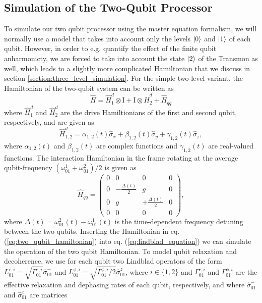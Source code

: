 \subsection{Simulation of the Two-Qubit Processor}

To simulate our two qubit processor using the master equation formalism, we will normally use a model that takes into account only the levels $\left| 0 \right>$ and $\left| 1 \right>$ of each qubit. However, in order to e.g. quantify the effect of the finite qubit anharmonicty, we are forced to take into account the state $\left| 2 \right>$ of the Transmon as well, which leads to a slightly more complicated Hamiltonian that we discuss in section \ref{section:three_level_simulation}. For the simple two-level variant, the Hamiltonian of the two-qubit system can be written as
%
\begin{equation}
\hat{H} = \hat{H}_1^d\otimes\mathrm{I}+\mathrm{I}\otimes\hat{H}_2^d+\hat{H}_{qq} \label{eq:two_qubit_hamiltonian}
\end{equation}
%
where $\hat{H}_1^d$ and $\hat{H}_2^d$ are the drive Hamiltionians of the first and second qubit, respectively, and are given as
%
\begin{equation}
\hat{H}_{1,2}^d = \alpha_{1,2}(t)\hat{\sigma}_x+\beta_{1,2}(t)\hat{\sigma}_y+\gamma_{1,2}(t)\hat{\sigma}_z,
\end{equation}
%
where $\alpha_{1,2}(t)$ and $\beta_{1,2}(t)$ are complex functions and $\gamma_{1,2}(t)$ are real-valued functions. The interaction Hamiltonian in the frame rotating at the average qubit-frequency $(\omega_{01}^1+\omega_{01}^2)/2$ is given as
%
\begin{equation}
\hat{H}_{qq} = \left(\begin{array}{cccc}0 & 0 & 0 & 0 \\ 0 & -\frac{\Delta(t)}{2} & g & 0 \\ 0 & g & +\frac{\Delta(t)}{2} & 0 \\ 0 & 0 & 0 & 0 \end{array}\right),
\end{equation}
%
where $\Delta(t)=\omega_{01}^2(t)-\omega_{01}^1(t)$ is the time-dependent frequency detuning between the two qubits. Inserting the Hamiltonian in eq. (\ref{eq:two_qubit_hamiltonian}) into eq. (\ref{eq:lindblad_equation}) we can simulate the operation of the two qubit Hamiltonian. To model qubit relaxation and decoherence, we use for each qubit two Lindblad operators of the form $L_{01}^{r,i}=\sqrt{\Gamma_{01}^{r,i}}\hat{\sigma}_{01}^-$ and $L_{01}^{\phi,i}=\sqrt{\Gamma_{01}^{\phi,i}/2}\hat{\sigma}_{01}^z$, where $i\in\{1,2\}$ and $\Gamma_{01}^{r,i}$ and $\Gamma_{01}^{\phi,i}$ are the effective relaxation and dephasing rates of each qubit, respectively, and where $\hat{\sigma}_{01}^-$ and $\hat{\sigma}_{01}^z$ are matrices
